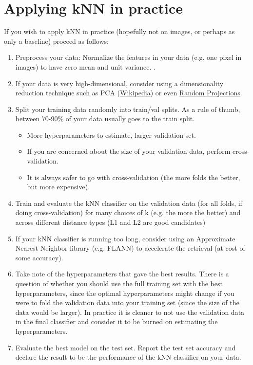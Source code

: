 \section{Applying kNN in practice}
If you wish to apply kNN in practice (hopefully not on images, or perhaps as only a baseline) proceed as follows:
\begin{enumerate}
  \item Preprocess your data: Normalize the features in your data (e.g. one pixel in images) to have zero mean and unit variance. .
  \item If your data is very high-dimensional, consider using a dimensionality reduction technique such as PCA (\href{https://en.wikipedia.org/wiki/Principal_component_analysis}{Wikipedia}) or even \href{http://scikit-learn.org/stable/modules/random_projection.html}{Random Projections}.
  \item Split your training data randomly into train/val splits. As a rule of thumb, between 70-90\% of your data usually goes to the train split.
      \begin{itemize}
        \item More hyperparameters to estimate, larger validation set.
        \item If you are concerned about the size of your validation data, perform cross-validation.
        \item It is always safer to go with cross-validation (the more folds the better, but more expensive).
      \end{itemize}
  \item Train and evaluate the kNN classifier on the validation data (for all folds, if doing cross-validation) for many choices of k (e.g. the more the better) and across different distance types (L1 and L2 are good candidates)
  \item If your kNN classifier is running too long, consider using an Approximate Nearest Neighbor library (e.g. FLANN) to accelerate the retrieval (at cost of some accuracy).
  \item Take note of the hyperparameters that gave the best results. There is a question of whether you should use the full training set with the best hyperparameters, since the optimal hyperparameters might change if you were to fold the validation data into your training set (since the size of the data would be larger). In practice it is cleaner to not use the validation data in the final classifier and consider it to be burned on estimating the hyperparameters. 
  \item Evaluate the best model on the test set. Report the test set accuracy and declare the result to be the performance of the kNN classifier on your data.
\end{enumerate}



